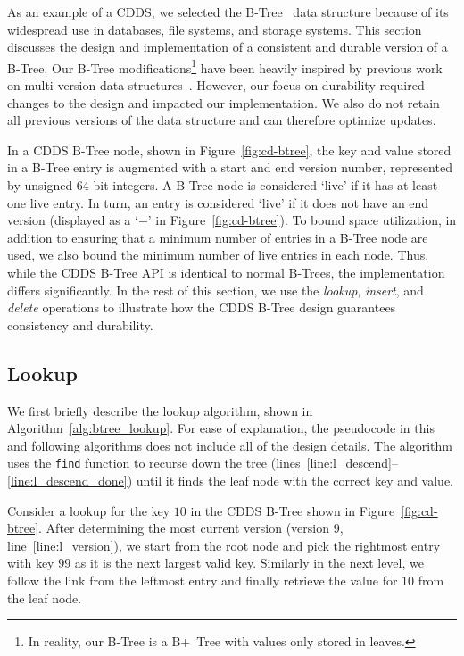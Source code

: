 As an example of a CDDS, we selected the B-Tree~\citep{Comer79} data
structure because of its widespread use in databases, file systems,
and storage systems.  This section discusses the design and
implementation of a consistent and durable version of a B-Tree.  Our
B-Tree modifications\footnote{In reality, our B-Tree is a B+~Tree with
  values only stored in leaves.} have been heavily inspired by
previous work on multi-version data
structures~\citep{Becker96,Varman97}.  However, our focus on
durability required changes to the design and impacted our
implementation.  We also do not retain all previous versions of the
data structure and can therefore optimize updates.

In a CDDS B-Tree node, shown in Figure~\ref{fig:cd-btree}, the key and
value stored in a B-Tree entry is augmented with a start and end
version number, represented by unsigned 64-bit integers.  A B-Tree
node is considered `live' if it has at least one live entry.  In turn,
an entry is considered `live' if it does not have an end version
(displayed as a `$-$' in Figure~\ref{fig:cd-btree}). To bound space utilization, in
addition to ensuring that a minimum number of entries in a B-Tree node
are used, we also bound the minimum number
of live entries in each node.  Thus, while the CDDS B-Tree API is
identical to normal B-Trees, the implementation differs
significantly.
In the rest of this section, we use the \textit{lookup},
\textit{insert}, and \textit{delete} operations to illustrate how the
CDDS B-Tree design guarantees consistency and durability.


\subsection{Lookup}
\label{sec:btree_lookup}

We first briefly describe the lookup algorithm, shown in 
Algorithm~\ref{alg:btree_lookup}.  For ease of explanation,
the pseudocode in this and following algorithms does not
include all of the design details.  The algorithm uses the
\texttt{find} function to recurse down the tree
(lines~\ref{line:l_descend}--\ref{line:l_descend_done}) until it finds
the leaf node with the correct key and value.



Consider a lookup for the key $10$ in the CDDS B-Tree shown in
Figure~\ref{fig:cd-btree}.  After determining the most current version
(version $9$, line~\ref{line:l_version}), we start from the root node
and pick the rightmost entry with key $99$ as it is the next largest
valid key.  Similarly in the next level, we follow the link from the
leftmost entry and finally retrieve the value for $10$ from the leaf
node.

